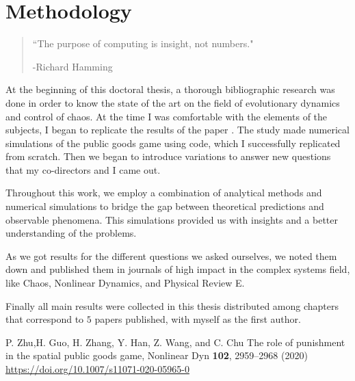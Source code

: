 \chapter{Methodology}
\label{chap:Method}


\begin{quotation}


	\vspace{-3cm}


    \begin{flushright}
    \begin{minipage}[t][5cm][b]{0.5\textwidth}
    { ``The purpose of computing is insight, not numbers."}
    
    \bigskip
    
    -{\small  Richard Hamming}
    \end{minipage}
    \end{flushright}
    
    \vspace{0.5cm}
\end{quotation}


At the beginning of this doctoral thesis, a thorough bibliographic research was done in order to know the state of the art on the field of evolutionary dynamics and control of chaos. At the time I was comfortable with the elements of the subjects, I began to replicate the results of the paper \cite{Replicate}. The study made numerical simulations of the public goods game using code, which I successfully replicated from scratch. Then we began to introduce variations to answer new questions that my co-directors and I came out.


Throughout this work, we employ a combination of analytical methods and numerical simulations to bridge the gap between theoretical predictions and observable phenomena. This simulations provided us with insights and a better understanding of the problems.

As we got results for the different questions we asked ourselves, we noted them down and published them in journals of high impact in the complex systems field, like Chaos, Nonlinear Dynamics, and Physical Review E.

Finally all main results were collected in this thesis distributed among chapters that correspond to $5$ papers published, with myself as the first author.

\begin{thebibliography}{02}


P. Zhu,H. Guo, H. Zhang, Y. Han, Z. Wang, and C. Chu
The role of punishment in the spatial public goods game,
Nonlinear Dyn \textbf{102}, 2959--2968 (2020) 
\url{https://doi.org/10.1007/s11071-020-05965-0}




\end{thebibliography}

